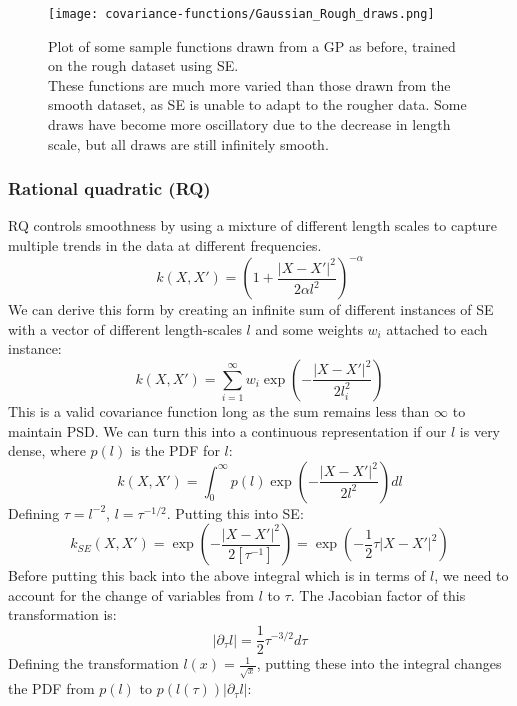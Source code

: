 \begin{figure}[H]
    \texttt{[image: covariance-functions/Gaussian\_Rough\_draws.png]}
    \caption{Plot of some sample functions drawn from a GP as before, trained on the rough dataset using SE. \\ 
        These functions are much more varied than those drawn from the smooth dataset, as SE is unable to adapt to the rougher data. Some draws have become more oscillatory due to the decrease in length scale, but all draws are still infinitely smooth.
    }
\end{figure}

\subsubsection{Rational quadratic (RQ)}
RQ controls smoothness by using a mixture of different length scales to capture multiple trends in the data at different frequencies. 
\begin{equation*}
    k(X,X') = \left( 1 + \frac{|X - X'|^2}{2\alpha l^2} \right)^{-\alpha}
\end{equation*}
We can derive this form by creating an infinite sum of different instances of SE with a vector of different length-scales $l$ and some weights $w_i$ attached to each instance:
\begin{equation*}
    k(X,X') = \sum_{i=1}^{\infty} w_i \exp \left( -\frac{|X - X'|^2}{2l_i^2} \right)
\end{equation*}
This is a valid covariance function long as the sum remains less than $\infty$ to maintain PSD. We can turn this into a continuous representation if our $l$ is very dense, where $p(l)$ is the PDF for $l$:
\begin{equation*}
    k(X,X') = \int_{0}^{\infty} p(l) \exp \left( -\frac{|X - X'|^2}{2l^2} \right) dl
\end{equation*}
Defining $\tau= l^{-2}$, $l = \tau^{-1/2}$. Putting this into SE:
\begin{equation*}
    k_{SE}(X,X') = \exp(-\frac{|X - X'|^2}{2[\tau^{-1}]}) = \exp(-\frac{1}{2} \tau |X - X'|^2)
\end{equation*}
Before putting this back into the above integral which is in terms of $l$, we need to account for the change of variables from $l$ to $\tau$. The Jacobian factor of this transformation is:
\begin{equation*}
    | \partial_{\tau} l | = \frac{1}{2} \tau^{-3/2} d\tau
\end{equation*}
Defining the transformation $l(x) = \frac{1}{\sqrt{x}}$, putting these into the integral changes the PDF from $p(l)$ to $p(l(\tau)) | \partial_{\tau}l |$:
